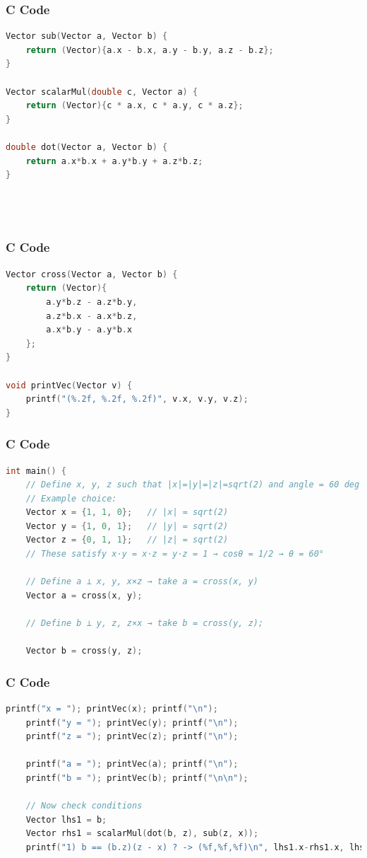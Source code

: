 \documentclass{beamer}
\theoremstyle{remark}
\numberwithin{equation}{section}
\begin{document}
\begin{frame}[fragile]
\frametitle{C Code }
\begin{lstlisting}[language=C]
 Vector sub(Vector a, Vector b) {
    return (Vector){a.x - b.x, a.y - b.y, a.z - b.z};
}

Vector scalarMul(double c, Vector a) {
    return (Vector){c * a.x, c * a.y, c * a.z};
}

double dot(Vector a, Vector b) {
    return a.x*b.x + a.y*b.y + a.z*b.z;
}


    
\end{lstlisting}
\end{frame}
\begin{frame}[fragile]
\frametitle{C Code }
\begin{lstlisting}[language=C]
Vector cross(Vector a, Vector b) {
    return (Vector){
        a.y*b.z - a.z*b.y,
        a.z*b.x - a.x*b.z,
        a.x*b.y - a.y*b.x
    };
}

void printVec(Vector v) {
    printf("(%.2f, %.2f, %.2f)", v.x, v.y, v.z);
}

\end{lstlisting}
\end{frame}
\begin{frame}[fragile]
\frametitle{C Code }
\begin{lstlisting}[language=C]
int main() {
    // Define x, y, z such that |x|=|y|=|z|=sqrt(2) and angle = 60 deg
    // Example choice:
    Vector x = {1, 1, 0};   // |x| = sqrt(2)
    Vector y = {1, 0, 1};   // |y| = sqrt(2)
    Vector z = {0, 1, 1};   // |z| = sqrt(2)
    // These satisfy x·y = x·z = y·z = 1 → cosθ = 1/2 → θ = 60°

    // Define a ⟂ x, y, x×z → take a = cross(x, y)
    Vector a = cross(x, y);

    // Define b ⟂ y, z, z×x → take b = cross(y, z);

    Vector b = cross(y, z);

\end{lstlisting}
\end{frame}
\begin{frame}[fragile]
\frametitle{C Code }
\begin{lstlisting}[language=C]
  printf("x = "); printVec(x); printf("\n");
    printf("y = "); printVec(y); printf("\n");
    printf("z = "); printVec(z); printf("\n");

    printf("a = "); printVec(a); printf("\n");
    printf("b = "); printVec(b); printf("\n\n");

    // Now check conditions
    Vector lhs1 = b;
    Vector rhs1 = scalarMul(dot(b, z), sub(z, x));
    printf("1) b == (b.z)(z - x) ? -> (%f,%f,%f)\n", lhs1.x-rhs1.x, lhs1.y-rhs1.y, lhs1.z-rhs1.z);

\end{lstlisting}
\end{frame}
\end{document}
